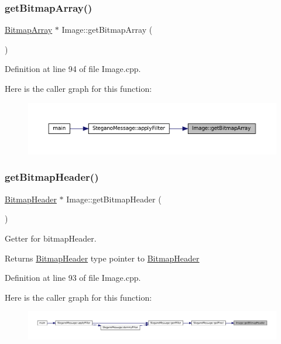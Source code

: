 \subsubsection{\texorpdfstring{getBitmapArray()}{getBitmapArray()}}
{\footnotesize\ttfamily \mbox{\hyperlink{classBitmapArray}{Bitmap\+Array}} $\ast$ Image\+::get\+Bitmap\+Array (\begin{DoxyParamCaption}{ }\end{DoxyParamCaption})}



Definition at line 94 of file Image.\+cpp.

Here is the caller graph for this function\+:
\nopagebreak
\begin{figure}[H]
\begin{center}
\leavevmode
\includegraphics[width=350pt]{classImage_a75b5051c6cc39a5e3f86d287f5cc7f9c_icgraph}
\end{center}
\end{figure}
\mbox{\label{classImage_a8c824ffac0c866a94752a2c1047932af}} 
\subsubsection{\texorpdfstring{getBitmapHeader()}{getBitmapHeader()}}
{\footnotesize\ttfamily \mbox{\hyperlink{classBitmapHeader}{Bitmap\+Header}} $\ast$ Image\+::get\+Bitmap\+Header (\begin{DoxyParamCaption}{ }\end{DoxyParamCaption})}



Getter for bitmap\+Header. 

\begin{DoxyReturn}{Returns}
\mbox{\hyperlink{classBitmapHeader}{Bitmap\+Header}} type pointer to \mbox{\hyperlink{classBitmapHeader}{Bitmap\+Header}} 
\end{DoxyReturn}


Definition at line 93 of file Image.\+cpp.

Here is the caller graph for this function\+:
\nopagebreak
\begin{figure}[H]
\begin{center}
\leavevmode
\includegraphics[width=350pt]{classImage_a8c824ffac0c866a94752a2c1047932af_icgraph}
\end{center}
\end{figure}
\mbox{\label{classImage_a885989eb723cb0a1fc0555c7e8de817e}} 
